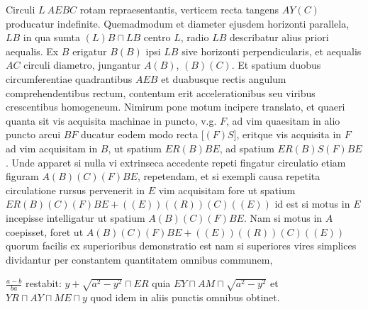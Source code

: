 \pstart Circuli $L\ AEBC$ rotam repraesentantis, verticem recta tangens $AY(C)$ producatur indefinite. Quemadmodum et diameter ejusdem horizonti parallela, $LB$ in qua sumta $(L)B \sqcap LB$ centro $L$, radio $LB$ describatur alius  priori aequalis. Ex $B$ erigatur $B(B)$ ipsi $LB$ sive horizonti perpendicularis, et aequalis $AC$ circuli diametro, jungantur $A(B)$, $(B)(C)$. Et spatium  duobus circumferentiae quadrantibus $AEB$ et  duabusque rectis  angulum comprehendentibus rectum, contentum erit accelerationibus\protect{} seu viribus crescentibus\protect{} homogeneum. Nimirum pone motum incipere  translato, et quaeri quanta sit vis acquisita machinae in  puncto, v.g. $F$, ad vim\protect{} quaesitam in alio puncto  arcui $BF$ ducatur eodem modo recta [$(F)S$], eritque vis acquisita in $F$ ad vim acquisitam\protect{} in $B$, ut spatium $ER(B)BE$, ad spatium $ER(B)S(F)BE$. Unde apparet si nulla vi extrinseca\protect{} accedente repeti fingatur circulatio etiam figuram $A(B)(C)(F)BE$, repetendam, et si exempli causa repetita circulatione rursus pervenerit in $E$ vim acquisitam\protect{} fore ut spatium $ER(B)(C)(F)BE + ((E))((R))(C)((E))$ id est si motus in $E$ incepisse intelligatur ut spatium $A(B)(C)(F)BE$. Nam si motus in $A$ coepisset, foret ut $A(B)(C)(F)BE + ((E))((R))(C)((E))$ quorum facilis ex superioribus demonstratio est nam si superiores vires simplices\protect{} dividantur per constantem quantitatem omnibus communem, \rule[-4mm]{0pt}{10mm}$\displaystyle \frac{a-b}{ba}$ restabit: $ y + \sqrt{a^2-y^2} \sqcap ER$ quia $ EY \sqcap AM \sqcap \sqrt{a^2-y^2}$ et $YR \sqcap AY \sqcap ME \sqcap y$ quod idem in aliis punctis omnibus obtinet.
